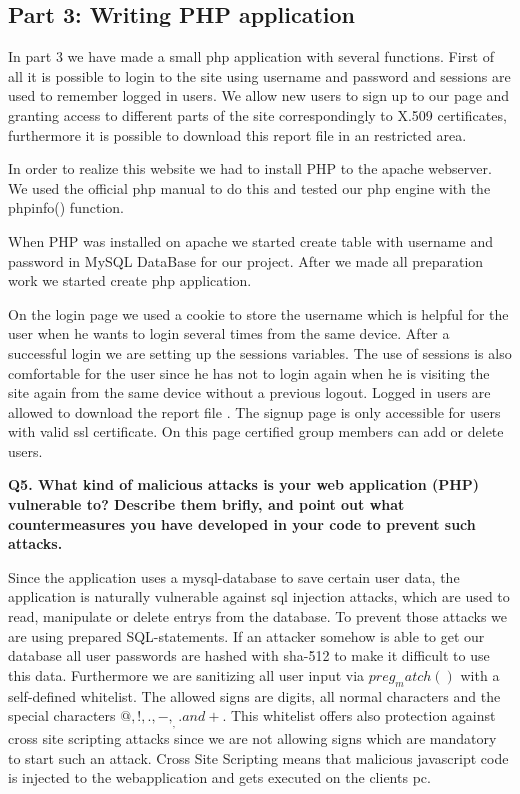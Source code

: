 \subsection {Part 3: Writing PHP application}


\noindent
In part 3 we have made a small php application with several functions. First of all it is possible to login to the site using username and password and sessions are used to remember logged in users. We allow new users to sign up to our page and granting access to different parts of the site correspondingly to X.509 certificates, furthermore it is possible to download this report file in an restricted area. \newline

\noindent
In order to realize this website we had to install PHP to the apache webserver. We used the official php manual to do this \cite{phpinstall}  and tested our php engine with the phpinfo() function.\newline

\noindent
When PHP was installed on apache we started  create table  with username and password  in MySQL DataBase for our project. After we made all preparation work we started create php application. 
\newline

\noindent
On the login page we used a cookie to store the username which is helpful for the user when he wants to login several times from the same device. After a successful login we are setting up the sessions variables. The use of sessions is also comfortable for the user since he has not to login again when he is visiting the site again from the same device without a previous logout. Logged in users  are allowed to download the report file . The signup page is only accessible for users with valid ssl certificate. On this page certified group members can add or delete users.
\newline

\noindent
{\bf Q5. What kind of malicious attacks is your web application (PHP) vulnerable to? Describe them brifly, and point out what countermeasures you have
developed in your code to prevent such attacks.}
\newline

\noindent
Since the application uses a mysql-database to save certain user data, the application is naturally vulnerable against sql injection attacks, which are used to read, manipulate or delete entrys from the database. To prevent those attacks we are using prepared SQL-statements. If an attacker somehow is able to get our database all user passwords are hashed with sha-512 to make it difficult to use this data. Furthermore we are sanitizing all user input via $preg_match()$ with a self-defined whitelist. The allowed signs are digits, all normal characters and the special characters $@,!,.,-,_,.and +$. This whitelist offers also protection against cross site scripting attacks since we are not allowing signs which are mandatory to start such an attack. Cross Site Scripting means that malicious javascript code is injected to the webapplication and gets executed on the clients pc. 
\newline

